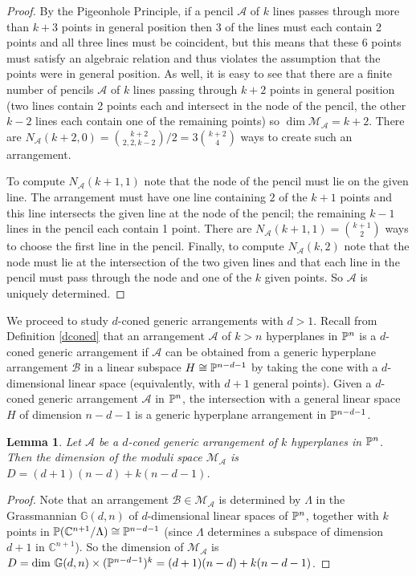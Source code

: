 \documentclass[12pt]{article}
\theoremstyle{plain}
\newtheorem{lemma}[theorem]{Lemma}
\theoremstyle{definition}
\newcommand{\A}{\mathcal{A}}
\newcommand{\M}{\mathcal{M}}
\newcommand{\MLA}{\M_{\A}}
\newcommand{\C}{\mathbb{C}}
\newcommand{\G}{\mathbb{G}}
\renewcommand{\P}{\ensuremath \mathbb{P}}
\begin{document}
\begin{proof}
  By the Pigeonhole Principle, if a pencil $\A$ of $k$ lines passes
  through more than $k+3$ points in general position then 3 of the
  lines must each contain 2 points and all three lines must be
  coincident, but this means that these 6 points must satisfy an
  algebraic relation and thus violates the assumption that the points
  were in general position. As well, it is easy to see that there
  are a finite number of pencils $\A$ of $k$ lines  passing through $k+2$ points
  in general position (two lines contain 2 points each and intersect
  in the node of the pencil, the other $k-2$ lines each contain one of
  the remaining points) so $\dim \MLA = k+2$. There are $N_\A(k+2,0) =
  \binom{k+2}{2,2,k-2}/2 = 3 \binom{k+2}{4}$ ways to create such an
  arrangement.

  To compute $N_\A(k+1,1)$ note that the node of the pencil must lie
  on the given line. The arrangement must have one line containing $2$
  of the $k+1$ points and this line intersects the given line at the
  node of the pencil; the remaining $k-1$ lines in the pencil each
  contain 1 point. There are $N_\A(k+1,1) = \binom{k+1}{2}$ ways to
  choose the first line in the pencil. Finally, to compute
  $N_\A(k,2)$ note that the node must lie at the intersection of the
  two given lines and that each line in the pencil must pass through
  the node and one of the $k$ given points. So $\A$ is uniquely
  determined. \end{proof}

We proceed to study $d$-coned generic arrangements with $d>1$. Recall
from Definition \ref{dconed} that an arrangement $\A$ of $k>n$
hyperplanes in $\P^n$ is a $d$-coned generic arrangement if $\A$ can
be obtained from a generic hyperplane arrangement $\mathcal{B}$ in a
linear subspace $H \cong \P^{n-d-1}$ by taking the cone with a
$d$-dimensional linear space (equivalently, with $d+1$ general
points). Given a $d$-coned generic arrangement $\A$ in $\P^n$, the
intersection with a general linear space $H$ of dimension $n-d-1$ is a
generic hyperplane arrangement in $\P^{n-d-1}$.


\begin{lemma} \label{dimlemma} Let $\A$ be a $d$-coned generic
  arrangement of $k$ hyperplanes in $\P^n$. Then the dimension of the
  moduli space $\M_\A$ is $D = (d+1)(n-d) + k(n-d-1)$.
\end{lemma}

\begin{proof}
Note that an arrangement $\mathcal{B} \in \M_\A$ is determined by $\Lambda$ in
the Grassmannian $\G(d,n)$ of $d$-dimensional linear spaces of
$\P^{n}$, together with $k$ points in $\P(\C^{n+1}/\Lambda) \cong
\P^{n-d-1}$ (since $\Lambda$ determines a subspace of dimension $d+1$
in $\C^{n+1}$). So the dimension of $\M_\A$ is $D = \text{dim } \G(d,n)
\times (\P^{n-d-1})^k = (d+1)(n-d) + k(n-d-1)$. 
\end{proof}
\end{document}
